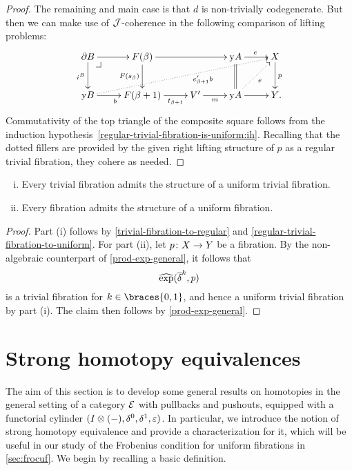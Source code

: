 \documentclass[reqno,10pt,a4paper,oneside,draft]{amsart}
\begin{document}
\begin{proof}
The remaining and main case is that $d$ is non-trivially codegenerate.
But then we can make use of $\cal{J}$-coherence in the following comparison of lifting problems:
\[
\xymatrix{
  \partial B
  \ar[r]
  \ar[d]_{i^B}
  \pullback{dr}
&
  F(\beta)
  \ar[rr]
  \ar[d]_{F(s_{\beta})}
&&
  \yon A
  \ar[r]^{e}
  \ar@{=}[d]
&
  X
  \ar[d]^{p}
\\
  \yon B
  \ar[r]_{b}
  \ar@{.>}[urrrr]_(0.6){e_{\beta+1}' b}
&
  F(\beta+1)
  \ar[r]_-{t_{\beta+1}}
&
  V'
  \ar[r]_-{m}
&
  \yon A
  \ar[r]
  \ar@{.>}[ur]_{e}
&
  Y
\rlap{.}}
\]
Commutativity of the top triangle of the composite square follows from the induction hypothesis~\eqref{regular-trivial-fibration-is-uniform:ih}.
Recalling that the dotted fillers are provided by the given right lifting structure of $p$ as a regular trivial fibration, they cohere as needed.
\end{proof}

\begin{theorem} \label{thm:ac-kan-is-uniform} \hfill
\begin{enumerate}[(i)]
\item Every trivial fibration admits the structure of a uniform trivial fibration.
\item Every fibration admits the structure of a uniform fibration.
\end{enumerate}
\end{theorem}

\begin{proof}
Part (i) follows by \cref{trivial-fibration-to-regular} and \cref{regular-trivial-fibration-to-uniform}.
For part (ii), let $p \co X \to Y$ be a fibration.
By the non-algebraic counterpart of \cref{prod-exp-general}, it follows that
\[
\hatexp(\overline{\delta}^k, p)
\]
is a trivial fibration for $k \in \braces{0, 1}$, and hence a uniform trivial fibration by part (i).
The claim then follows by \cref{prod-exp-general}.
\end{proof}


\section{Strong homotopy equivalences}
\label{sec:strhe}

The aim of this section is to develop some general results on homotopies in the general setting of a category $\catE$ with pullbacks and pushouts, equipped with a functorial cylinder $(\interval \otimes (-), \lcyl, \rcyl, \ccyl)$.
In particular, we introduce the notion of strong homotopy equivalence and provide a characterization for it, which will be useful in our study of the Frobenius condition for uniform fibrations in \cref{sec:frocuf}.
We begin by recalling a basic definition.
\end{document}
